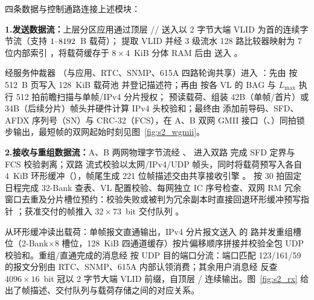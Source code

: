 四条数据与控制通路连接上述模块：

\noindent \textbf{1.\quad 发送数据流：}上层分区应用通过顶层 // 送入以 2 字节大端 VLID 为首的连续字节流（支持 $1\text{--}8192$~B 载荷）； 提取 VLID 并经 3 级流水 128 路比较器映射为 7 位内部索引 ，将载荷缓存于 $8\times 4$~KiB 分体 RAM 后由  送入 。


经服务仲裁器 （与应用、RTC、SNMP、615A 四路轮询共享）进入 ：先由  按 512~B 页写入 128~KiB 载荷池  并登记描述符；再由  按各 VL 的 BAG 与 $L_\text{max}$ 执行 512 拍前瞻扫描与单帧/IPv4 分片授权； 预读载荷、组装 42B（单帧/首片）或 34B（后续分片）帧头并硬件计算 IPv4 头校验和；最终由  添加前导码、SFD、AFDX 序列号（SN）与 CRC-32（FCS），在 A、B 双网 GMII 接口（、）同拍锁步输出，最短帧的双网起始时刻见图~\ref{fig:s2_wgmii}。

\noindent \textbf{2.\quad 接收与重组数据流：}A、B 两网物理字节流经 、 进入双路  完成 SFD 定界与 FCS 校验剥离；双路  流式校验以太网/IPv4/UDP 帧头，同时将载荷预写入各自 4~KiB 环形缓冲（），帧尾生成 221 位帧描述交由共享接收引擎 。 按 30 拍固定日程完成 32-Bank  查表、VL 配置校验、每网独立 IC 序号检查、双网 RM 冗余窗口去重及分片槽位预约：校验失败或被判为冗余副本时直接回退环形缓冲预写指针 ；获准交付的帧推入 $32\times 73$~bit 交付队列 。


 从环形缓冲读出载荷：单帧报文直通输出，IPv4 分片报文送入  的 \ReasmContexts{} 路并发重组槽位（2-Bank$\times$8 槽位，128~KiB 四通道缓存）按片偏移顺序拼接并校验全包 UDP 校验和。重组/直通完成的消息经  按 UDP 目的端口分流：端口匹配 123/161/59 的报文分别由 RTC、SNMP、615A 内部认领消费；其余用户消息经  反查 $4096\times 16$~bit  冠以 2 字节大端 VLID 前缀，自顶层 / 连续输出。图~\ref{fig:s2_rx} 给出了帧描述、交付队列与载荷存储之间的对应关系。

